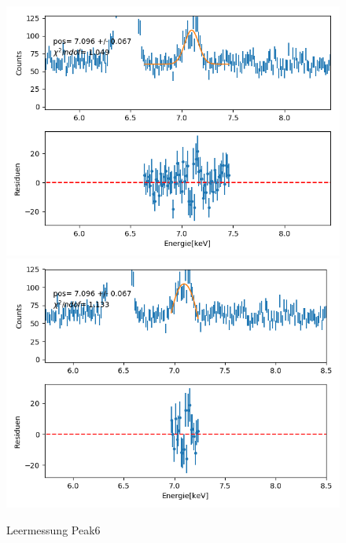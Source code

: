 \documentclass[12pt,a4paper]{article}
\begin{document}
\begin{figure}[H]
\centering
\includegraphics[scale=0.49]{Bilder/alpha_spektren/leer_6_1.png}
\includegraphics[scale=0.49]{Bilder/alpha_spektren/leer_6_2.png}
\caption{Leermessung Peak6}
\end{figure}
\end{document}
